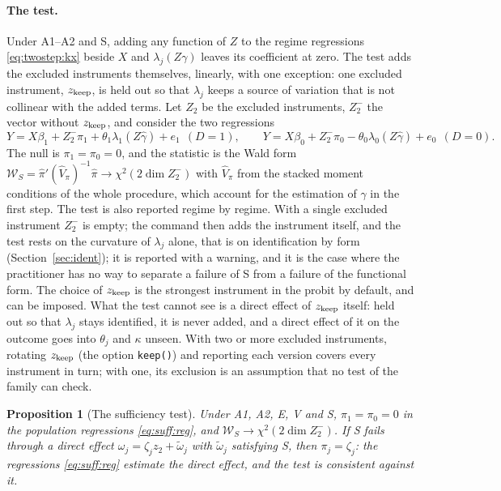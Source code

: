 \documentclass[11pt,a4paper]{article}
\theoremstyle{plain}
\newtheorem{proposition}{Proposition}
\theoremstyle{definition}
\theoremstyle{remark}
\newcommand{\1}{\mathbf{1}}
\newcommand{\cmd}[1]{\texttt{#1}}
\begin{document}
\paragraph{The test.}
Under A1--A2 and S, adding any function of $Z$ to the regime regressions
\eqref{eq:twostep:kx} beside $X$ and $\lambda_j(Z\gamma)$ leaves its
coefficient at zero. The test adds the excluded instruments themselves,
linearly, with one exception: one excluded instrument, $z_{\rm keep}$, is
held out so that $\lambda_j$ keeps a source of variation that is not
collinear with the added terms. Let $Z_2$ be the excluded instruments,
$Z_2^{-}$ the vector without $z_{\rm keep}$, and consider the two
regressions
\begin{equation}\label{eq:suff:reg}
Y=X\beta_1+Z_2^{-}\pi_1+\theta_1\lambda_1(Z\hat\gamma)+e_1\ \ (D=1),\qquad
Y=X\beta_0+Z_2^{-}\pi_0-\theta_0\lambda_0(Z\hat\gamma)+e_0\ \ (D=0).
\end{equation}
The null is $\pi_1=\pi_0=0$, and the statistic is the Wald form
$\mathcal{W}_S=\hat\pi'(\hat V_\pi)^{-1}\hat\pi\to\chi^2(2\dim Z_2^-)$ with
$\hat V_\pi$ from the stacked moment conditions of the whole procedure,
which account for the estimation of $\gamma$ in the first step. The test
is also reported regime by regime. With a single excluded instrument
$Z_2^-$ is empty; the command then adds the instrument itself, and the
test rests on the curvature of $\lambda_j$ alone, that is on identification
by form (Section~\ref{sec:ident}); it is reported with a warning, and it
is the case where the practitioner has no way to separate a failure of S
from a failure of the functional form. The choice of $z_{\rm keep}$ is the
strongest instrument in the probit by default, and can be imposed. What
the test cannot see is a direct effect of $z_{\rm keep}$ itself: held out
so that $\lambda_j$ stays identified, it is never added, and a direct
effect of it on the outcome goes into $\theta_j$ and $\kappa$ unseen. With
two or more excluded instruments, rotating $z_{\rm keep}$ (the option
\cmd{keep()}) and reporting each version covers every instrument in turn;
with one, its exclusion is an assumption that no test of the family can
check.

\begin{proposition}[The sufficiency test]\label{prop:suff}
Under A1, A2, E, V and S, $\pi_1=\pi_0=0$ in the population regressions
\eqref{eq:suff:reg}, and $\mathcal{W}_S\to\chi^2(2\dim Z_2^-)$. If S fails
through a direct effect $\omega_j=\zeta_jz_2+\tilde\omega_j$ with
$\tilde\omega_j$ satisfying S, then $\pi_j=\zeta_j$: the regressions
\eqref{eq:suff:reg} estimate the direct effect, and the test is consistent
against it.
\end{proposition}
\end{document}
